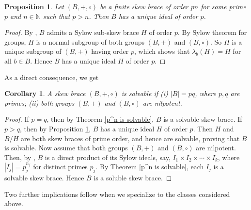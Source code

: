 \documentclass[11pt, oneside]{amsart}
\numberwithin{equation}{section}
\theoremstyle{plain}
\newtheorem{cor}[equation]{Corollary}
\newtheorem{pro}[equation]{Proposition}
\theoremstyle{definition}
\begin{document}
\begin{pro}\label{pn, uniqe ideal}
     Let $(B,+,\circ)$ be a finite skew brace of order $pn$ for some prime $p$ and $n\in \mathbb{N}$ such that $p>n$. Then $B$ has a unique ideal of order $p$. 
\end{pro}
\begin{proof}
    By \cite{Tru26}, $B$ admits  a Sylow sub-skew brace $H$ of order $p$. By Sylow theorem for groups, $H$ is a normal subgroup of both groups $(B,+)$ and $(B,\circ)$. So $H$ is a unique subgroup of $(B,+)$ having order $p$, which shows that $\lambda_b(H)=H$ for all $b\in B$. Hence $B$ has a unique ideal $H$ of order $p$. 
\end{proof}

As a direct consequence, we get
\begin{cor}\label{pq solvable}
   A skew brace $(B, +, \circ)$ is solvable if (i) $|B|= pq$, where $p, q$ are primes; (ii) both groups $(B,+)$ and $(B,\circ)$ are nilpotent. 
\end{cor}
\begin{proof}
    If $p=q$, then by Theorem \ref{p^n is solvable}, $B$ is a solvable skew brace. If $p>q$, then by Proposition \ref{pn, uniqe ideal}, $B$ has a unique ideal $H$ of order $p$. Then $H$ and $B/H$ are both skew braces of prime order, and hence are solvable, proving that $B$ is solvable.  Now assume that both groups $(B,+)$ and $(B,\circ)$ are nilpotent. Then, by \cite[Corollary 4.3.]{CSV19}, $B$ is a direct product of its Sylow ideals, say, $I_1\times I_2\times \cdots \times I_k $, where $|I_j| = p_j^{n_j}$ for distinct primes  $p_j$. By Theorem \ref{p^n is solvable}, each $I_j$ is a solvable skew brace. Hence $B$ is a soluble skew brace.
\end{proof}

Two further implications follow when we specialize to the classes considered above.
\end{document}
